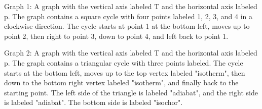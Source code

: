 Graph 1: A graph with the vertical axis labeled T and the horizontal axis labeled p. The graph contains a square cycle with four points labeled 1, 2, 3, and 4 in a clockwise direction. The cycle starts at point 1 at the bottom left, moves up to point 2, then right to point 3, down to point 4, and left back to point 1.

Graph 2: A graph with the vertical axis labeled T and the horizontal axis labeled p. The graph contains a triangular cycle with three points labeled. The cycle starts at the bottom left, moves up to the top vertex labeled "isotherm", then down to the bottom right vertex labeled "isotherm", and finally back to the starting point. The left side of the triangle is labeled "adiabat", and the right side is labeled "adiabat". The bottom side is labeled "isochor".